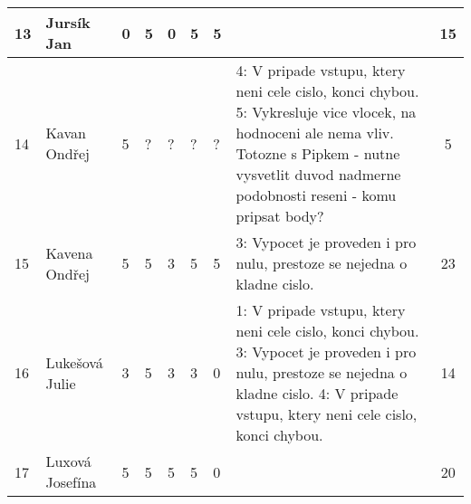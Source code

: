\documentclass[landscape, 12pt]{article}
\begin{document}
\begin{longtable}{|l l | C{0.7cm} | C{0.7cm} | C{0.7cm} | C{0.7cm} | C{0.7cm} | L{15cm} |c|}
  13 & Jursík Jan         &       0 &       5 &       0 &       5 &       5 &                                                                                                                                                                                                                                                                                                                                                                                      &       15 \\
\hline

  14 & Kavan Ondřej       &       5 &       ? &       ? &       ? &       ? & 4: V pripade vstupu, ktery neni cele cislo, konci chybou. 5: Vykresluje vice vlocek, na hodnoceni ale nema vliv.       Totozne s Pipkem - nutne vysvetlit duvod nadmerne podobnosti reseni - komu pripsat body?                                                                                                                                                                                                                                                                                             &       5 \\
\hline

  15 & Kavena Ondřej      &       5 &       5 &       3 &       5 &       5 & 3: Vypocet je proveden i pro nulu, prestoze se nejedna o kladne cislo.                                                                                                                                                                                                                                                                                                                  &       23 \\
\hline

  16 & Lukešová Julie     &       3 &       5 &       3 &       3 &       0 & 1: V pripade vstupu, ktery neni cele cislo, konci chybou. 3: Vypocet je proveden i pro nulu, prestoze se nejedna o kladne cislo. 4: V pripade vstupu, ktery neni cele cislo, konci chybou.                                                                                                                                                                                                          &       14 \\
\hline

  17 & Luxová Josefína    &       5 &       5 &       5 &       5 &       0 &                                                                                                                                                                                                                                                                                                                                                                                      &       20 \\
\hline


\end{longtable}
\end{document}
